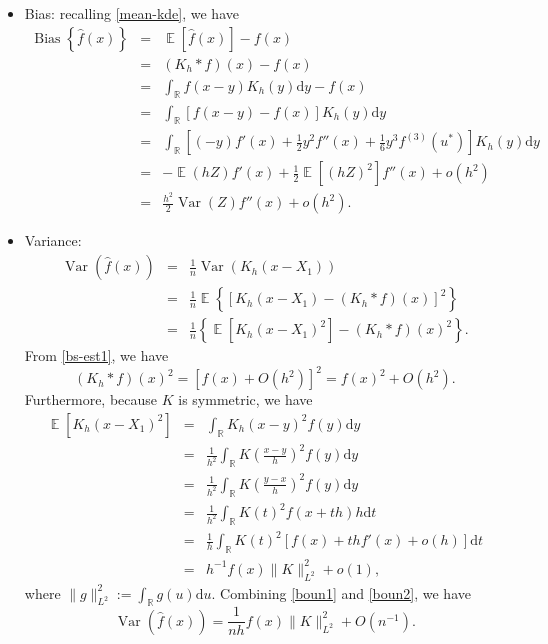 \documentclass[19pt,landscape]{article}
\DeclareMathOperator{\E}{\mathbb{E}}
\newcommand{\R}{\mathbb{R}}
\DeclareMathOperator{\var}{\mathrm{Var}}
\DeclareMathOperator{\bs}{\mathrm{Bias}}
\begin{document}
    \begin{itemize}
        \item Bias: recalling \eqref{mean-kde}, we have 
        \begin{eqnarray}
            \bs\left\{\hat{f}(x)\right\}&=&\E\left[\hat{f}(x)\right]-f(x)\nonumber\\
            &=&(K_h*f)(x)-f(x)\nonumber\\
            &=&\int_{\R}f(x-y)K_h(y)\mathrm{d}y-f(x)\nonumber\\
            &=&\int_{\R}[f(x-y)-f(x)]K_h(y)\mathrm{d}y\nonumber\\
            &=&\int_{\R}\left[(-y)f'(x)+\frac12y^2f''(x)+\frac16y^3f^{(3)}(u^*)\right]K_h(y)\mathrm{d}y\\
            &=&-\E(hZ)f'(x)+\frac12\E[(hZ)^2]f''(x)+o(h^2)\nonumber\\
            &=&\frac{h^2}2\var(Z)f''(x)+o(h^2).\label{bs-est1}
        \end{eqnarray}
        \item Variance:
        \begin{eqnarray}
            \var\left(\hat{f}(x)\right)&=&\frac1n\var\left(K_h(x-X_1)\right)\nonumber\\
            &=&\frac1n\E\left\{[K_h(x-X_1)-(K_h*f)(x)]^2\right\}\nonumber\\
            &=&\frac1n\left\{\E\left[K_h(x-X_1)^2\right]-(K_h*f)(x)^2\right\}.
        \end{eqnarray}
        From \eqref{bs-est1}, we have 
        \begin{equation}\label{boun1}
            (K_h*f)(x)^2=\left[f(x)+O(h^2)\right]^2=f(x)^2+O(h^2).
        \end{equation}
        Furthermore, because $K$ is symmetric, we have 
        \begin{eqnarray}
            \E\left[K_h(x-X_1)^2\right]&=&\int_{\R}K_h(x-y)^2f(y)\mathrm{d}y\nonumber\\
            &=&\frac1{h^2}\int_{\R}K\left(\frac{x-y}h\right)^2f(y)\mathrm{d}y\\
            &=&\frac1{h^2}\int_{\R}K\left(\frac{y-x}h\right)^2f(y)\mathrm{d}y\\
            &=&\frac1{h^2}\int_{\R}K(t)^2f(x+th)h\mathrm{d}t\nonumber\\
            &=&\frac1h\int_{\R}K(t)^2[f(x)+thf'(x)+o(h)]\mathrm{d}t\\
            &=&h^{-1}f(x)\|K\|_{L^2}^2+o(1),\label{boun2}
        \end{eqnarray}
        where $\|g\|_{L^2}^2:=\int_{\R}g(u)\mathrm{d}u$. 
        Combining \eqref{boun1} and \eqref{boun2}, we have 
        \begin{equation}
            \var\left(\hat{f}(x)\right)=\frac1{nh}f(x)\|K\|_{L^2}^2+O(n^{-1}).
        \end{equation}
    \end{itemize}
\end{document}
